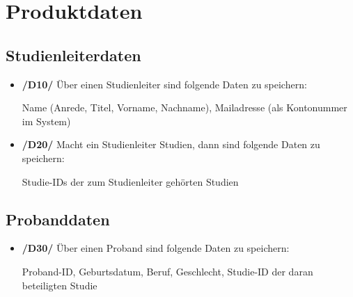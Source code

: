 \documentclass[a4paper]{scrreprt}
\begin{document}
    \chapter{Produktdaten}
        \section{Studienleiterdaten}
            \begin{itemize}
                \item \textbf{/D10/} Über einen \gls{Studienleiter} sind folgende Daten zu speichern:
                    \par Name (Anrede, Titel, Vorname, Nachname), Mailadresse (als Kontonummer im System)

                \item \textbf{/D20/} Macht ein \gls{Studienleiter} Studien, dann sind folgende Daten zu speichern:
                    \par Studie-IDs der zum \gls{Studienleiter} gehörten Studien
            \end{itemize}

        \section{Probanddaten}
            \begin{itemize}
                \item \textbf{/D30/} Über einen \gls{Proband} sind folgende Daten zu speichern:
                    \par \gls{Proband}-ID, Geburtsdatum, Beruf, Geschlecht, Studie-ID der daran beteiligten Studie
            \end{itemize}
\end{document}
